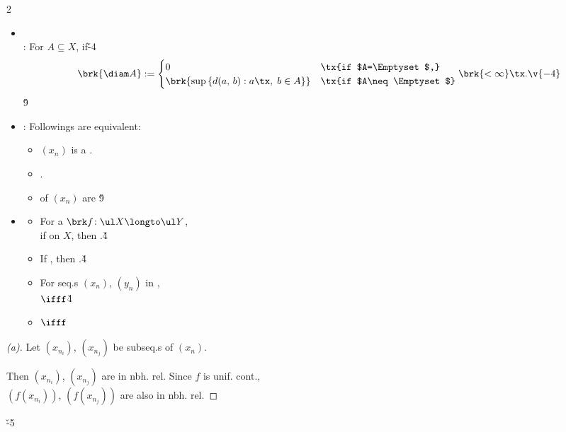 \documentclass[dvipdfmx,a4paper,titlepage,9pt]{jsarticle}
\begin{document}
\begin{multicols*}{2}
\begin{itemize}[label=-]
\item{}\\
: For $A\subseteq X$,  if\v{-4}
$$\brk{\diam A}:=\begin{cases} 0 & \tx{if $A=\Emptyset$,}\\ \brk{\sup{}\{d(a,\,b):a\tx,\;b\in A\}} & \tx{if $A\neq\Emptyset$}\end{cases}\brk{<\infty}\tx.\v{-4}$$
\;\v9

\item{}
: Followings are equivalent:
\begin{itemize}[label=\Cdot]
\setlength{\leftskip}{-10pt}
\item $(x_n)$ is a .
\item {}.
\item {} of $(x_n)$ are \v9
\end{itemize}

\item{}
\begin{itemize}[label=\Cdot]
\setlength{\leftskip}{-10pt}
\item For a  $\brk f\!:\ul X\longto\ul Y$,\\
if  on $X$, then .\v4

\item If , then .\v4

\item For seq.s $(x_n)$, $(y_n)$ in ,\\
\quad$\ifff$\quad{}\v4

\item {}\quad$\ifff$\quad{}
\end{itemize}
\end{itemize}

\begin{pfbox}
\begin{proof}[\color{TGreen}(a)]
Let $(x_{n_i})$, $(x_{n_j})$ be subseq.s of $(x_n)$.

Then $(x_{n_i})$, $(x_{n_j})$ are in nbh. rel. Since $f$ is unif. cont.,\\
$(f(x_{n_i}))$, $(f(x_{n_j}))$ are also in nbh. rel.
\end{proof}\v{-5}


\end{pfbox}
\end{multicols*}
\end{document}
